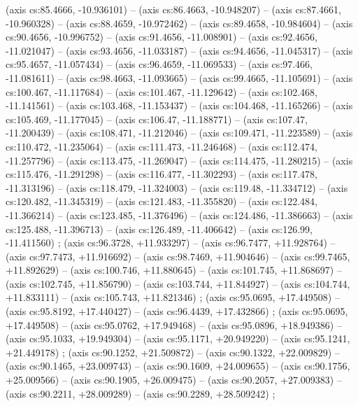     (axis cs:85.4666,    -10.936101) --  (axis cs:86.4663,    -10.948207) --  (axis cs:87.4661,    -10.960328) --  (axis cs:88.4659,    -10.972462) --  (axis cs:89.4658,    -10.984604) --  (axis cs:90.4656,    -10.996752) --  (axis cs:91.4656,    -11.008901) --  (axis cs:92.4656,    -11.021047) --  (axis cs:93.4656,    -11.033187) --  (axis cs:94.4656,    -11.045317) --  (axis cs:95.4657,    -11.057434) --  (axis cs:96.4659,    -11.069533) --  (axis cs:97.466,    -11.081611) --  (axis cs:98.4663,    -11.093665) --  (axis cs:99.4665,    -11.105691) --  (axis cs:100.467,    -11.117684) --  (axis cs:101.467,    -11.129642) --  (axis cs:102.468,    -11.141561) --  (axis cs:103.468,    -11.153437) --  (axis cs:104.468,    -11.165266) --  (axis cs:105.469,    -11.177045) --  (axis cs:106.47,    -11.188771) --  (axis cs:107.47,    -11.200439) --  (axis cs:108.471,    -11.212046) --  (axis cs:109.471,    -11.223589) --  (axis cs:110.472,    -11.235064) --  (axis cs:111.473,    -11.246468) --  (axis cs:112.474,    -11.257796) --  (axis cs:113.475,    -11.269047) --  (axis cs:114.475,    -11.280215) --  (axis cs:115.476,    -11.291298) --  (axis cs:116.477,    -11.302293) --  (axis cs:117.478,    -11.313196) --  (axis cs:118.479,    -11.324003) --  (axis cs:119.48,    -11.334712) --  (axis cs:120.482,    -11.345319) --  (axis cs:121.483,    -11.355820) --  (axis cs:122.484,    -11.366214) --  (axis cs:123.485,    -11.376496) --  (axis cs:124.486,    -11.386663) --  (axis cs:125.488,    -11.396713) --  (axis cs:126.489,    -11.406642) --  (axis cs:126.99,    -11.411560) ;
    (axis cs:96.3728,    +11.933297) --  (axis cs:96.7477,    +11.928764) --  (axis cs:97.7473,    +11.916692) --  (axis cs:98.7469,    +11.904646) --  (axis cs:99.7465,    +11.892629) --  (axis cs:100.746,    +11.880645) --  (axis cs:101.745,    +11.868697) --  (axis cs:102.745,    +11.856790) --  (axis cs:103.744,    +11.844927) --  (axis cs:104.744,    +11.833111) --  (axis cs:105.743,    +11.821346) ;
    (axis cs:95.0695,    +17.449508) --  (axis cs:95.8192,    +17.440427) --  (axis cs:96.4439,    +17.432866) ;
    (axis cs:95.0695,    +17.449508) --  (axis cs:95.0762,    +17.949468) --  (axis cs:95.0896,    +18.949386) --  (axis cs:95.1033,    +19.949304) --  (axis cs:95.1171,    +20.949220) --  (axis cs:95.1241,    +21.449178) ;
    (axis cs:90.1252,    +21.509872) --  (axis cs:90.1322,    +22.009829) --  (axis cs:90.1465,    +23.009743) --  (axis cs:90.1609,    +24.009655) --  (axis cs:90.1756,    +25.009566) --  (axis cs:90.1905,    +26.009475) --  (axis cs:90.2057,    +27.009383) --  (axis cs:90.2211,    +28.009289) --  (axis cs:90.2289,    +28.509242) ;
